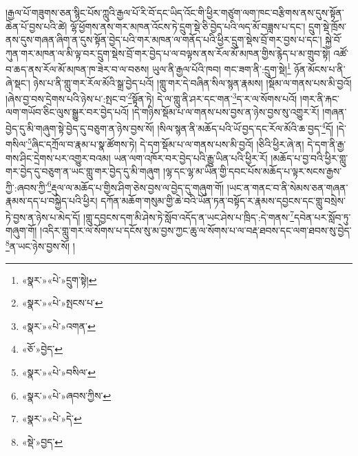 །རྒྱལ་པོ་གཟུགས་ཅན་སྙིང་པོས་ཀླུའི་རྒྱལ་པོ་རི་བོ་དང་ཡིད་འོང་གི་ཕྱིར་གཙུག་ལག་ཁང་བརྩིགས་ནས་དུས་སྟོན་ཆེན་པོ་བྱས་པའི་ཚེ། ལྷོ་ཕྱོགས་ནས་གར་མཁན་འོངས་ཏེ་དྲུག་སྡེ་ཅི་བྱེད་པའི་ལད་མོ་བཟླས་པ་དང་། དྲུག་སྡེ་ཁྲོས་ནས་དུས་གཞན་ཞིག་ན་དུས་སྟོན་བྱེད་པའི་གར་མཁན་ལ་གནོད་པའི་ཕྱིར་དྲུག་སྡེས་བྲོ་གར་བྱས་པ་དང་། སྐྱེ་བོ་ཀུན་གར་མཁན་ལ་མི་ལྟ་བར་དྲུག་སྡེས་བྲོ་གར་བྱེད་པ་ལ་བལྟས་ནས་རོལ་མོ་མཁན་གྱིས་རྙེད་པ་མ་གྲུབ་སྟེ། འཚོ་བ་ཆད་ནས་རོལ་མོ་མཁན་ཁ་ཟེར་བ་ལ་བཅས། ཡུལ་ནི་རྒྱལ་པོའི་ཁབ། གང་ཟག་ནི་:དྲུག་སྡེ།\footnote{«སྣར་»«པེ་»དྲུག་སྟེ།} ཉོན་མོངས་པ་ནི་ཞེ་སྡང་། ཉེས་པ་ནི་གླུ་གར་རོལ་མོའི་སྒྲ་བྱེད་པའོ། །གླུ་གར་དེ་བཞིན་སིལ་སྙན་རྣམས། །སྡོམ་ལ་གནས་པས་མི་བྱའོ། །ཞེས་བྱ་བས་དྲེགས་པའི་ཉེས་པ་:སྤང་བ་\footnote{«སྣར་»«པེ་»སྤངས་པ་}སྟོན་ཏེ། དེ་ལ་གླུ་ནི་ཤར་དང་གན་\footnote{«སྣར་»«པེ་»འགན་}ད་ར་ལ་སོགས་པའོ། །གར་ནི་རྐང་ལག་གཡོབ་ཅིང་ལུས་སྒྱུར་བར་བྱེད་པའོ། །དེ་གཉིས་སྡོམ་པ་ལ་གནས་པས་བྱས་ན་ཉེས་བྱས་སུ་འགྱུར་རོ། །གཞན་བྱེད་དུ་མི་གཞུག་སྟེ་བྱེད་དུ་བཅུག་ན་ཉེས་བྱས་སོ། །སིལ་སྙན་ནི་མཆོད་པའི་ཡོ་བྱད་དང་རོལ་མོའི་ཆ་བྱད་\footnote{«ཅོ་»བྱེད་}དོ། །དེ་གསིལ་\footnote{«སྣར་»«པེ་»བསིལ་}ཞིང་དཀྲོལ་བ་རྣམ་པ་སྣ་ཚོགས་ཏེ། དེ་དག་སྡོམ་པ་ལ་གནས་པས་མི་བྱའོ། །ཅིའི་ཕྱིར་ཞེ་ན། དེ་དག་ནི་རྒྱ་གས་ཤིང་དྲེགས་པར་འགྱུར་བའམ། ཡན་ལག་འཁོར་བར་བྱེད་པའི་རྒྱུ་ཡིན་པའི་ཕྱིར་རོ། །མཆོད་པ་བྱ་བའི་ཕྱིར་གླུ་གར་བྱེད་དུ་བཅུག་ན་ཡང་གླུ་གར་བྱེད་དུ་མི་གཞུག །ལྷ་དང་ལྷ་མ་ཡིན་གྱི་དབང་པོས་མཆོད་པ་ལྟར་སངས་རྒྱས་ཀྱི་:ཞབས་ཀྱི་\footnote{«སྣར་»«པེ་»ཞབས་ཀྱིས་}རྡུལ་ལ་མཆོད་པ་གྱིས་ཤིག་ཅེས་བྱས་ལ་བྱེད་དུ་གཞུག་གོ། །ཡང་ན་གནང་བ་ནི་སེམས་ཅན་གཞན་རྣམས་དད་པ་བསྐྱེད་པའི་ཕྱིར། དཀོན་མཆོག་གསུམ་གྱི་ཆེ་བའི་ཡོན་ཏན་བསྟོད་ར་རྣམས་དབྱངས་དང་གླུ་བསྲེས་ཏེ་བྱས་ན་ཉེས་པ་མེད་དོ། །གླུ་དབྱངས་དག་མི་ཤེས་ཏེ་སློབ་འདོད་ན་ཡང་ཤེས་པ་ཁྲིད་:དེ་གནས་\footnote{«སྣར་»«པེ་»དེ་}དབེན་པར་སློབ་ཏུ་གཞུག་གོ། །འདིར་གླུ་གར་ལ་སོགས་པ་དངོས་སུ་མ་བྱས་ཀྱང་ཆུ་ལ་སོགས་པ་ལ་བརྡ་ཐབས་དང་ལག་ཐབས་སུ་བྱེད་\footnote{«སྡེ་»བྱད་}ན་ཡང་ཉེས་བྱས་སོ། །
